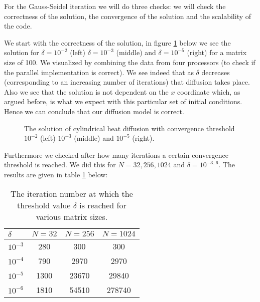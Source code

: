 \documentclass[11pt,a4paper,onecolumn]{article}
\begin{document}
For the Gauss-Seidel iteration we will do three checks: we will check the correctness of the solution, the convergence of the solution and the scalability of the code.

We start with the correctness of the solution, in figure \ref{fig:gausscorr} below we see the solution for $\delta = 10^{-2}$ (left) $\delta = 10^{-3}$ (middle) and $\delta = 10^{-5}$ (right) for a matrix size of 100. We visualized by combining the data from four processors (to check if the parallel implementation is correct). We see indeed that as $\delta$ decreases (corresponding to an increasing number of iterations) that diffusion takes place. Also we see that the solution is not dependent on the $x$ coordinate which, as argued before, is what we expect with this particular set of initial conditions. Hence we can conclude that our diffusion model is correct.

\begin{figure}[H]
  \centering
  \caption{The solution of cylindrical heat diffusion with convergence threshold $10^{-2}$ (left) $10^{-3}$ (middle) and $10^{-5}$ (right).}
  \label{fig:gausscorr}
\end{figure}

Furthermore we checked after how many iterations a certain convergence threshold is reached. We did this for $N = 32, 256, 1024$ and $\delta = 10^{-3..6}$. The results are given in table \ref{tab:gausscorr} below:

\begin{table}[H]
  \centering
  \begin{tabular}{l | c | c | c}
    \hline
    $\delta$ & $N = 32$ & $N = 256$ & $N = 1024$ \\
    \hline
    $10^{-3}$ & 280 & 300 & 300\\
    $10^{-4}$ & 790 & 2970 & 2970\\
    $10^{-5}$ & 1300 & 23670 & 29840\\
    $10^{-6}$ & 1810 & 54510 & 278740\\
  \end{tabular}
  \caption{The iteration number at which the threshold value $\delta$ is reached for various matrix sizes.}
  \label{tab:gausscorr}
\end{table}
\end{document}

